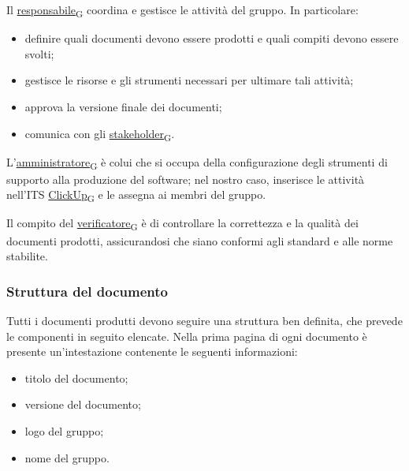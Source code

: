 Il \href{https://7last.github.io/docs/rtb/documentazione-interna/glossario\#responsabile}{responsabile\textsubscript{G}} coordina e gestisce le attività del gruppo. In particolare:
\begin{itemize}
	\item definire quali documenti devono essere prodotti e quali compiti devono essere svolti;
	\item gestisce le risorse e gli strumenti necessari per ultimare tali attività;
	\item approva la versione finale dei documenti;
	\item comunica con gli \href{https://7last.github.io/docs/rtb/documentazione-interna/glossario\#stakeholder}{stakeholder\textsubscript{G}}.
\end{itemize}

L’\href{https://7last.github.io/docs/rtb/documentazione-interna/glossario\#amministratore}{amministratore\textsubscript{G}} è colui che si occupa della configurazione degli strumenti di supporto alla produzione del software; nel nostro caso,
inserisce le attività nell'ITS \href{https://7last.github.io/docs/rtb/documentazione-interna/glossario\#clickup}{ClickUp\textsubscript{G}} e le assegna ai membri del gruppo.

Il compito del \href{https://7last.github.io/docs/rtb/documentazione-interna/glossario\#verificatore}{verificatore\textsubscript{G}} è di controllare la correttezza e la qualità dei documenti prodotti, assicurandosi che siano conformi agli standard e alle norme stabilite.

\subsubsection{Struttura del documento}
Tutti i documenti produtti devono seguire una struttura ben definita, che prevede le componenti in seguito elencate.
Nella prima pagina di ogni documento è presente un'intestazione contenente le seguenti informazioni:
\begin{itemize}
	\item titolo del documento;
	\item versione del documento;
	\item logo del gruppo;
	\item nome del gruppo.
\end{itemize}

